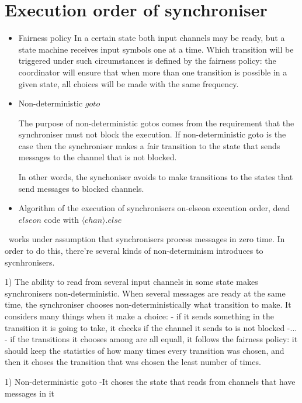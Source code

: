 \section{Execution order of synchroniser\label{execod}}
\begin{itemize}
\item Fairness policy
In a certain state both input channels may be ready, but a state machine receives input symbols one at a time. Which transition will be triggered under such circumstances is defined by the fairness policy: the coordinator will ensure that when more than one transition is possible in a given state, all choices will be made with the same frequency.

\item Non-deterministic $goto$

The purpose of non-deterministic gotos comes from the requirement that the synchroniser must not block the execution. If non-deterministic goto is the case then the synchroniser makes a fair transition to the state that sends messages to the channel that is not blocked.

In other words, the synchoniser avoids to make transitions to the states that send messages to blocked channels.


\item Algorithm of the execution of synchronisers
on-elseon execution order, dead $elseon$ code with $\langle chan \rangle .else$
\end{itemize}

\ak\ works under assumption that synchronisers process messages in zero time. In order to do this, there're several kinds of non-determinism introduces to sycnhronisers.

1) The ability to read from several input channels in some state makes synchronisers non-deterministic. When several messages are ready at the same time, the synchroniser chooses non-deterministically what transition to make. 
It considers many things when it make a choice:
- if it sends something in the transition it is going to take, it checks if the channel it sends to is not blocked
-...
- if the transitions it chooses among are all equall, it follows the fairness policy: it should keep the statistics of how many times every transition was chosen, and then it choses the transition that was chosen the least number of times.

1) Non-deterministic goto
-It choses the state that reads from channels that have messages in it



